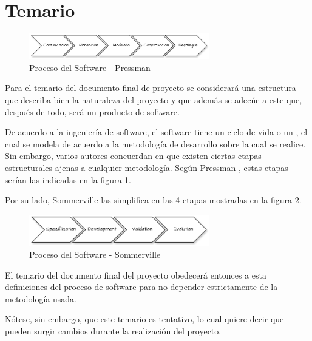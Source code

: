 \section{Temario} \label{syllabus}

\begin{figure}[!thpb]
    \centering
    \includegraphics[width=0.7\textwidth]{assets/proceso_pressman_white}
    \caption{Proceso del Software - Pressman}
    \label{fig:proceso_pressman}
\end{figure}

Para el temario del documento final de proyecto se considerará una estructura que describa bien la naturaleza del proyecto y que además se adecúe a este que, después de todo, será un producto de software.

De acuerdo a la ingeniería de software, el software tiene un ciclo de vida o un , el cual se modela de acuerdo a la metodología de desarrollo sobre la cual se realice. Sin embargo, varios autores concuerdan en que existen ciertas etapas estructurales ajenas a cualquier metodología. Según Pressman \cite[13]{pressmanSoftwareEngineeringPractitioner2010}, estas etapas serían las indicadas en la figura \ref{fig:proceso_pressman}.

Por su lado, Sommerville las simplifica en las 4 etapas mostradas en la figura \ref{fig:proceso_sommerville}.

\begin{figure}[!thpb]
    \centering
    \includegraphics[width=0.7\textwidth]{assets/proceso_sommerville_white.pdf}
    \caption{Proceso del Software - Sommerville}
    \label{fig:proceso_sommerville}
\end{figure}

El temario del documento final del proyecto obedecerá entonces a esta definiciones del proceso de software para no depender estrictamente de la metodología usada.

Nótese, sin embargo, que este temario es tentativo, lo cual quiere decir que pueden surgir cambios durante la realización del proyecto.

